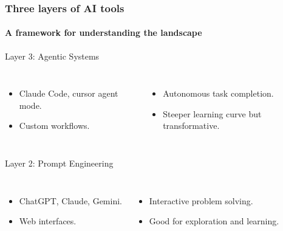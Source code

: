 \documentclass[aspectratio=169]{beamer}
\begin{document}
\begin{frame}
    \frametitle{Three layers of AI tools}
    \framesubtitle{A framework for understanding the landscape}
    \begin{block}{Layer 3: Agentic Systems}
        \vspace{-0.3cm}
        \begin{columns}
            \begin{itemize}
                \item Claude Code, cursor agent mode.
                \item Custom workflows.
            \end{itemize}
            \begin{itemize}
                \item Autonomous task completion.
                \item Steeper learning curve but transformative.
            \end{itemize}
        \end{columns}
    \end{block}
    
    \vspace{0.5cm}
    
    \begin{block}{Layer 2: Prompt Engineering}
        \vspace{-0.3cm}
        \begin{columns}
            \begin{itemize}
                \item ChatGPT, Claude, Gemini.
                \item Web interfaces.
            \end{itemize}
            \begin{itemize}
                \item Interactive problem solving.
                \item Good for exploration and learning.
            \end{itemize}
        \end{columns}
    \end{block}
    
    \vspace{0.5cm}
    

\end{frame}
\end{document}

